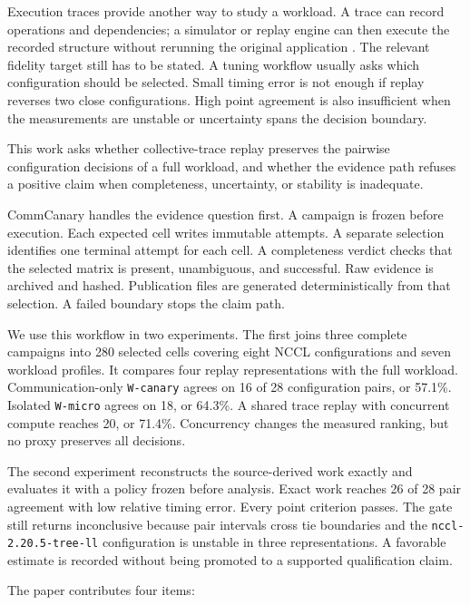 \documentclass[10pt,twocolumn]{article}
\newcommand{\wname}[1]{\texttt{W-#1}}
\begin{document}
Execution traces provide another way to study a workload. A trace can record
operations and dependencies; a simulator or replay engine can then execute the
recorded structure without rerunning the original application
\cite{chakra,mystique,astrasim,astrasim2,scalatrace,loggopsim}. The relevant
fidelity target still has to be stated. A tuning workflow usually asks which
configuration should be selected. Small timing error is not enough if replay
reverses two close configurations. High point agreement is also insufficient
when the measurements are unstable or uncertainty spans the decision boundary.

This work asks whether collective-trace replay preserves the pairwise
configuration decisions of a full workload, and whether the evidence path
refuses a positive claim when completeness, uncertainty, or stability is
inadequate.

CommCanary handles the evidence question first. A campaign is frozen before
execution. Each expected cell writes immutable attempts. A separate selection
identifies one terminal attempt for each cell. A completeness verdict checks
that the selected matrix is present, unambiguous, and successful. Raw evidence
is archived and hashed. Publication files are generated deterministically from
that selection. A failed boundary stops the claim path.

We use this workflow in two experiments. The first joins three complete
campaigns into 280 selected cells covering eight NCCL configurations and seven
workload profiles. It compares four replay representations with the full
workload. Communication-only \wname{canary} agrees on 16 of 28 configuration
pairs, or 57.1\%. Isolated \wname{micro} agrees on 18, or 64.3\%. A shared trace
replay with concurrent compute reaches 20, or 71.4\%. Concurrency changes the
measured ranking, but no proxy preserves all decisions.

The second experiment reconstructs the source-derived work exactly and
evaluates it with a policy frozen before analysis. Exact work reaches 26 of 28
pair agreement with low relative timing error. Every point criterion passes.
The gate still returns inconclusive because pair intervals cross tie boundaries
and the \texttt{nccl-2.20.5-tree-ll} configuration is unstable in three
representations. A favorable estimate is recorded without being promoted to a
supported qualification claim.

The paper contributes four items:
\end{document}
